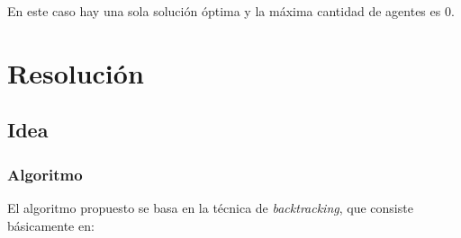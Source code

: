 \documentclass[10pt, a4paper]{article}
\begin{document}
		En este caso hay una sola soluci\'on \'optima y la m\'axima cantidad de agentes es 0.


\section{Resoluci\'on}

%	
	
	\subsection{Idea}
	
	\subsubsection{Algoritmo}
		El algoritmo propuesto se basa en la t\'ecnica de \textit{backtracking}, que consiste b\'asicamente en:
		
\end{document}
